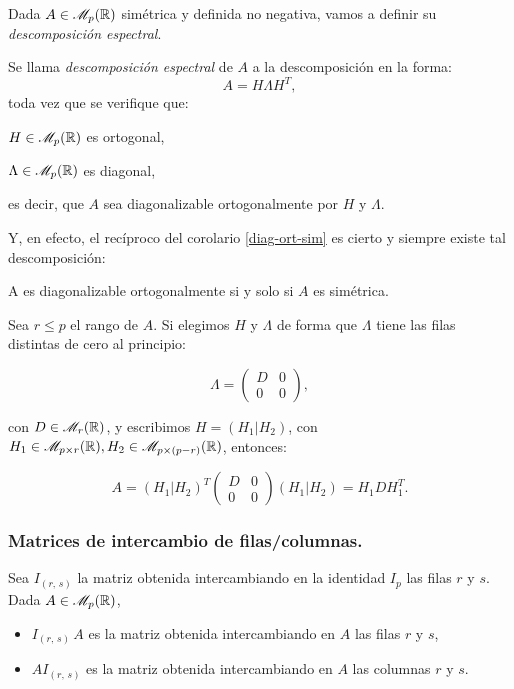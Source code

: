 Dada $A\in \mathscr{M}_{p}(\mathbb{R})$ simétrica y definida no negativa, vamos a definir su \emph{descomposición espectral}.

\begin{ndef}
  Se llama \emph{descomposición espectral} de $A$ a la descomposición en la forma:
  \[
  A = H\Lambda H^T,
  \]
  toda vez que se verifique que:
  \begin{nlist}
  \item $H\in \mathscr{M}_{p}(\mathbb{R})$ es ortogonal,
  \item $\Lambda\in \mathscr{M}_{p}(\mathbb{R})$ es diagonal,
  \end{nlist}
  es decir, que $A$ sea diagonalizable ortogonalmente por $H$ y $\Lambda$.
\end{ndef}

Y, en efecto, el recíproco del corolario \ref{diag-ort-sim} es cierto y siempre existe tal descomposición:

\begin{nth}
  A es diagonalizable ortogonalmente si y solo si $A$ es simétrica.
\end{nth}

Sea $r \le p$ el rango de $A$. Si elegimos $H$ y $\Lambda$ de forma que $\Lambda$ tiene las filas distintas de cero
al principio:

\[
  \Lambda = 
  \begin{pmatrix}
    D & 0 \\
    0 & 0
  \end{pmatrix},
\]

con $D \in \mathscr{M}_r(\mathbb{R})$, y escribimos $H = (H_1 | H_2)$, con $H_1\in \mathscr{M}_{p\times r}(\mathbb{R}), H_2\in \mathscr{M}_{p\times (p-r)}(\mathbb{R})$,
entonces:

\[
  A = (H_1 | H_2)^T \begin{pmatrix}
    D & 0 \\
    0 & 0
  \end{pmatrix} (H_1 | H_2) = H_1 D H_1^T.
\]

\subsubsection{Matrices de intercambio de filas/columnas.}

Sea $I_{(r,\,s)}$ la matriz obtenida intercambiando en la identidad $I_p$ las filas $r$ y $s$. Dada $A\in \mathscr{M}_{p}(\mathbb{R})$,

\begin{itemize}
\item $I_{(r,\,s)}\,A$ es la matriz obtenida intercambiando en $A$ las filas $r$ y $s$,
\item $AI_{(r,\,s)}$ es la matriz obtenida intercambiando en $A$ las columnas $r$ y $s$.
\end{itemize}

